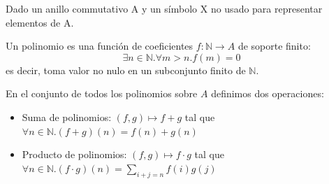 \begin{definition}
Dado un anillo commutativo A y un símbolo X no usado para representar elementos de A. 

Un polinomio es una función de coeficientes $f: \mathbb{N} \to A$ de soporte finito: $$\exists n \in \mathbb{N}. \forall m > n. f(m) = 0$$ es decir, toma valor no nulo en un subconjunto finito de $\mathbb{N}$. 

En el conjunto de todos los polinomios sobre $A$ definimos dos operaciones:

\begin{itemize}
\item Suma de polinomios: $(f,g) \mapsto f+g$ tal que $\forall n \in \mathbb{N}.(f+g)(n) = f(n) +g(n)$
\item Producto de polinomios: $(f,g) \mapsto f \cdot g$ tal que $ \forall n \in \mathbb{N}.(f \cdot g)(n) = \sum_{i+j = n} f(i) g(j)$
\end{itemize}
\end{definition}

